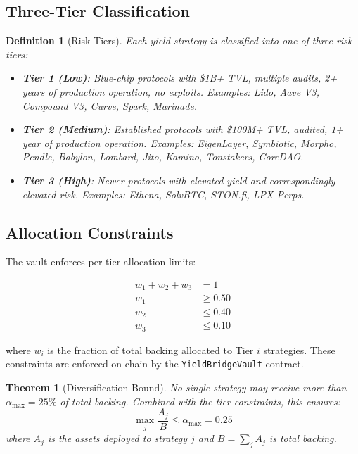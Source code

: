 \documentclass[11pt,twocolumn]{article}
\newtheorem{theorem}{Theorem}[section]
\newtheorem{definition}{Definition}[section]
\begin{document}
\subsection{Three-Tier Classification}

\begin{definition}[Risk Tiers]
Each yield strategy is classified into one of three risk tiers:
\begin{itemize}[nosep]
  \item \textbf{Tier 1 (Low)}: Blue-chip protocols with \$1B+ TVL, multiple audits, 2+ years of production operation, no exploits. Examples: Lido, Aave V3, Compound V3, Curve, Spark, Marinade.
  \item \textbf{Tier 2 (Medium)}: Established protocols with \$100M+ TVL, audited, 1+ year of production operation. Examples: EigenLayer, Symbiotic, Morpho, Pendle, Babylon, Lombard, Jito, Kamino, Tonstakers, CoreDAO.
  \item \textbf{Tier 3 (High)}: Newer protocols with elevated yield and correspondingly elevated risk. Examples: Ethena, SolvBTC, STON.fi, LPX Perps.
\end{itemize}
\end{definition}

\subsection{Allocation Constraints}

The vault enforces per-tier allocation limits:

\begin{equation}\label{eq:allocation}
\begin{aligned}
  w_1 + w_2 + w_3 &= 1 \\
  w_1 &\geq 0.50 \\
  w_2 &\leq 0.40 \\
  w_3 &\leq 0.10
\end{aligned}
\end{equation}

where $w_i$ is the fraction of total backing allocated to Tier $i$ strategies. These constraints are enforced on-chain by the \texttt{YieldBridgeVault} contract.

\begin{theorem}[Diversification Bound]\label{thm:diversification}
No single strategy may receive more than $\alpha_{\max} = 25\%$ of total backing. Combined with the tier constraints, this ensures:
\begin{equation}
  \max_j \frac{A_j}{B} \leq \alpha_{\max} = 0.25
\end{equation}
where $A_j$ is the assets deployed to strategy $j$ and $B = \sum_j A_j$ is total backing.
\end{theorem}
\end{document}
